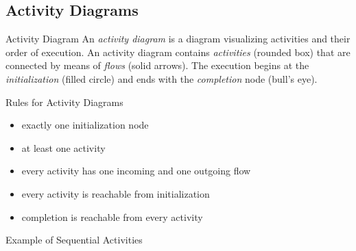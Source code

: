 
\subsection{Activity Diagrams}
\begin{frame}{\insertsubsection}
	\begin{fancycolumns}[animation=none]
		\nextcolumn
		\begin{definition}{Activity Diagram }
			An \emph{activity diagram} is a diagram visualizing activities and their order of execution. An activity diagram contains \emph{activities} (rounded box) that are connected by means of \emph{flows} (solid arrows). The execution begins at the \emph{initialization} (filled circle) and ends with the \emph{completion} node (bull's eye). 
		\end{definition}
		\pause%
		\begin{note}{Rules for Activity Diagrams}
			\begin{itemize}
				\item exactly one initialization node
				\item at least one activity
				\item every activity has one incoming and one outgoing flow
				\item every activity is reachable from initialization
				\item completion is reachable from every activity
			\end{itemize}
		\end{note}
	\end{fancycolumns}
\end{frame}

\begin{frame}{Example of Sequential Activities}
\end{frame}

